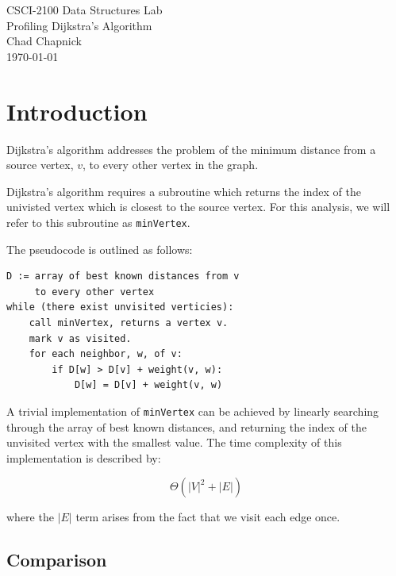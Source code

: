\documentclass[technote]{IEEEtran}
\begin{document}
\begin{titlepage}
    \vspace*{\fill}
    \begin{center}
        {\Huge CSCI-2100 Data Structures Lab}\\[0.3cm]
        {\huge Profiling Dijkstra's Algorithm}\\[0.6cm]
        {\Large Chad Chapnick}\\[0.4cm]
        {\small\today}
    \end{center}
    \vspace*{\fill}
\end{titlepage}
\section{Introduction}

Dijkstra's algorithm addresses the problem of 
the minimum distance from a source vertex, $v$, to every 
other vertex in the graph. 


Dijkstra's algorithm requires a subroutine which returns 
the index of the univisted vertex which is closest to the source vertex.
For this analysis, we will refer to this subroutine as \texttt{minVertex}.

The pseudocode is outlined as follows:
\begin{lstlisting}
D := array of best known distances from v
     to every other vertex
while (there exist unvisited verticies):
    call minVertex, returns a vertex v.
    mark v as visited.
    for each neighbor, w, of v:
        if D[w] > D[v] + weight(v, w):
            D[w] = D[v] + weight(v, w)
\end{lstlisting}





A trivial implementation of \texttt{minVertex} can be achieved by linearly 
searching through the array of best known distances, and returning the 
index of the unvisited vertex with the smallest value. 
The time complexity of this implementation is described by:

$$\Theta(|V|^2 + |E|)$$

where the $|E|$ term arises from the fact that we visit each edge once.

\subsection{Comparison}
\end{document}
